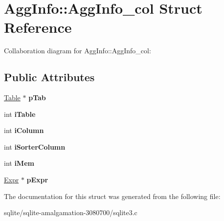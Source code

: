 \hypertarget{struct_agg_info_1_1_agg_info__col}{\section{Agg\+Info\+:\+:Agg\+Info\+\_\+col Struct Reference}
\label{struct_agg_info_1_1_agg_info__col}
}


Collaboration diagram for Agg\+Info\+:\+:Agg\+Info\+\_\+col\+:
\subsection*{Public Attributes}
\begin{DoxyCompactItemize}
\item 
\hypertarget{struct_agg_info_1_1_agg_info__col_ad2f2ae137b49e72d28a57accc9d06386}{\hyperlink{struct_table}{Table} $\ast$ {\bfseries p\+Tab}}\label{struct_agg_info_1_1_agg_info__col_ad2f2ae137b49e72d28a57accc9d06386}

\item 
\hypertarget{struct_agg_info_1_1_agg_info__col_ab49aa2fbfc6278c86b64497a6807c113}{int {\bfseries i\+Table}}\label{struct_agg_info_1_1_agg_info__col_ab49aa2fbfc6278c86b64497a6807c113}

\item 
\hypertarget{struct_agg_info_1_1_agg_info__col_a4cad2ce99ddf7425d358d49e40524f6b}{int {\bfseries i\+Column}}\label{struct_agg_info_1_1_agg_info__col_a4cad2ce99ddf7425d358d49e40524f6b}

\item 
\hypertarget{struct_agg_info_1_1_agg_info__col_ae3901ad0d5b6d519a7559358f1f7248b}{int {\bfseries i\+Sorter\+Column}}\label{struct_agg_info_1_1_agg_info__col_ae3901ad0d5b6d519a7559358f1f7248b}

\item 
\hypertarget{struct_agg_info_1_1_agg_info__col_ae22f3dfc6f9c2dc647be1b9fbd14e896}{int {\bfseries i\+Mem}}\label{struct_agg_info_1_1_agg_info__col_ae22f3dfc6f9c2dc647be1b9fbd14e896}

\item 
\hypertarget{struct_agg_info_1_1_agg_info__col_a60f23ec0abfcc88cab7083967a3abd9e}{\hyperlink{struct_expr}{Expr} $\ast$ {\bfseries p\+Expr}}\label{struct_agg_info_1_1_agg_info__col_a60f23ec0abfcc88cab7083967a3abd9e}

\end{DoxyCompactItemize}


The documentation for this struct was generated from the following file\+:\begin{DoxyCompactItemize}
\item 
sqlite/sqlite-\/amalgamation-\/3080700/sqlite3.\+c\end{DoxyCompactItemize}
